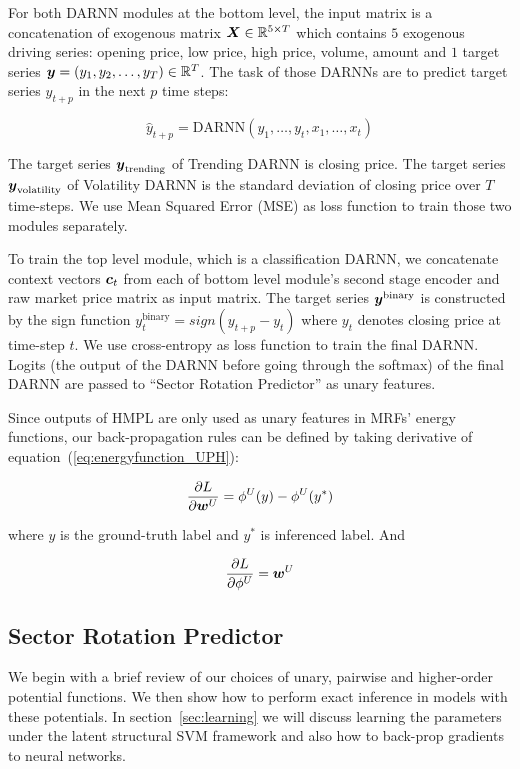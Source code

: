 \documentclass[sigconf, anonymous, review]{acmart}
\begin{document}
For both DARNN modules at the bottom level, the input matrix is a
concatenation of exogenous matrix ${\boldsymbol{X}} \in \mathbb{R}^{5\times T}$
which contains $5$ exogenous driving series: opening price, low
price, high price, volume, amount and $1$ target series ${\boldsymbol{y}} =
(y_1,y_2,\dots,y_T) \in \mathbb{R}^T$. The task of those DARNNs are
to predict target series $y_{t+p}$ in the next $p$ time steps:

$$\hat{y}_{t+p} = \text{DARNN}(y_1,\dots,y_{t},x_1,\dots,x_t)$$

The target series ${\boldsymbol{y}}_{\text{trending}}$ of Trending DARNN is
closing price. The target series ${\boldsymbol{y}}_{\text{volatility}}$ of
Volatility DARNN is the standard deviation of closing price over
$T$ time-steps. We use Mean Squared Error (MSE) as loss function
to train those two modules separately.

To train the top level module, which is a classification DARNN,
we concatenate context vectors $\boldsymbol{c}_t$ from each of bottom level
module's second stage encoder and raw market price matrix as
input matrix. The target series ${\boldsymbol{y}}^{\text{binary}}$ is
constructed by the sign function $y_t^{\text{binary}} =
sign(y_{t+p}-y_t)$ where $y_t$ denotes closing price at time-step
$t$. We use cross-entropy as loss function to train the final
DARNN. Logits (the output of the DARNN before going through the
softmax) of the final DARNN are passed to ``Sector Rotation
Predictor'' as unary features.

Since outputs of HMPL are only used as unary features in MRFs'
energy functions, our back-propagation rules can be defined by
taking derivative of equation~(\ref{eq:energyfunction_UPH}):

\begin{align}
  \label{eq:der_w}
  \frac{\partial L}{\partial {\boldsymbol{w}}^U} = \phi^U(y)-\phi^U(y^*)
\end{align}

\noindent where $y$ is the ground-truth label and $y^*$ is
inferenced label. And

\begin{align}
  \label{eq:der_phi}
  \frac{\partial L}{\partial \phi^U} = {\boldsymbol{w}}^U
\end{align}


\subsection{Sector Rotation Predictor}
\label{sec:srp}

We begin with a brief review of our choices of unary, pairwise
and higher-order potential functions. We then show how to perform
exact inference in models with these potentials. In
section~\ref{sec:learning} we will discuss learning the
parameters under the latent structural SVM framework and also how
to back-prop gradients to neural networks.
\end{document}
